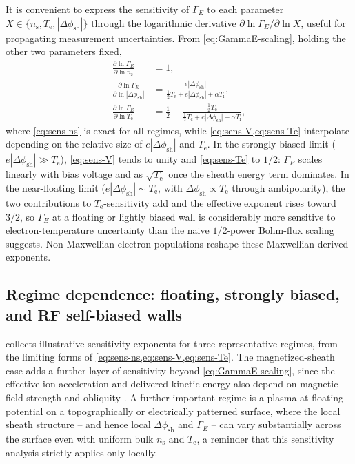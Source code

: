 It is convenient to express the sensitivity of $\Gamma_{E}$ to each parameter $X \in \{n_{\mathrm{s}}, T_{\mathrm{e}}, |\Delta\phi_{\mathrm{sh}}|\}$ through the logarithmic derivative $\partial \ln \Gamma_{E} / \partial \ln X$, useful for propagating measurement uncertainties. From \cref{eq:GammaE-scaling}, holding the other two parameters fixed,
\begin{align}
\frac{\partial \ln \Gamma_{E}}{\partial \ln n_{\mathrm{s}}} &= 1, \label{eq:sens-ns}\\[4pt]
\frac{\partial \ln \Gamma_{E}}{\partial \ln |\Delta\phi_{\mathrm{sh}}|} &= \frac{e|\Delta\phi_{\mathrm{sh}}|}{\tfrac12 T_{\mathrm{e}} + e|\Delta\phi_{\mathrm{sh}}| + \alpha T_{\mathrm{i}}}, \label{eq:sens-V}\\[4pt]
\frac{\partial \ln \Gamma_{E}}{\partial \ln T_{\mathrm{e}}} &= \frac{1}{2} + \frac{\tfrac12 T_{\mathrm{e}}}{\tfrac12 T_{\mathrm{e}} + e|\Delta\phi_{\mathrm{sh}}| + \alpha T_{\mathrm{i}}}, \label{eq:sens-Te}
\end{align}
where \cref{eq:sens-ns} is exact for all regimes, while \cref{eq:sens-V,eq:sens-Te} interpolate depending on the relative size of $e|\Delta\phi_{\mathrm{sh}}|$ and $T_{\mathrm{e}}$. In the strongly biased limit ($e|\Delta\phi_{\mathrm{sh}}| \gg T_{\mathrm{e}}$), \cref{eq:sens-V} tends to unity and \cref{eq:sens-Te} to $1/2$: $\Gamma_{E}$ scales linearly with bias voltage and as $\sqrt{T_{\mathrm{e}}}$ once the sheath energy term dominates. In the near-floating limit ($e|\Delta\phi_{\mathrm{sh}}| \sim T_{\mathrm{e}}$, with $\Delta\phi_{\mathrm{sh}} \propto T_{\mathrm{e}}$ through ambipolarity), the two contributions to $T_{\mathrm{e}}$-sensitivity add and the effective exponent rises toward $3/2$, so $\Gamma_{E}$ at a floating or lightly biased wall is considerably more sensitive to electron-temperature uncertainty than the naive $1/2$-power Bohm-flux scaling suggests. Non-Maxwellian electron populations reshape these Maxwellian-derived exponents.

\subsection{Regime dependence: floating, strongly biased, and RF self-biased walls}

 collects illustrative sensitivity exponents for three representative regimes, from the limiting forms of \cref{eq:sens-ns,eq:sens-V,eq:sens-Te}. The magnetized-sheath case adds a further layer of sensitivity beyond \cref{eq:GammaE-scaling}, since the effective ion acceleration and delivered kinetic energy also depend on magnetic-field strength and obliquity \cite{ref0088}. A further important regime is a plasma at floating potential on a topographically or electrically patterned surface, where the local sheath structure -- and hence local $\Delta\phi_{\mathrm{sh}}$ and $\Gamma_{E}$ -- can vary substantially across the surface even with uniform bulk $n_{\mathrm{s}}$ and $T_{\mathrm{e}}$, a reminder that this sensitivity analysis strictly applies only locally.

